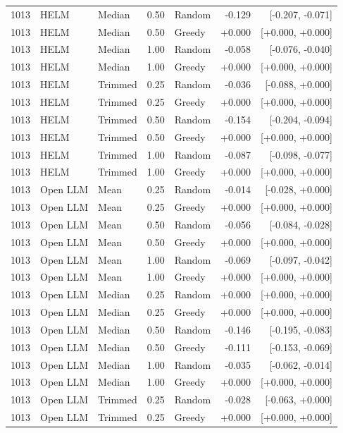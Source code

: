 \documentclass{article}
\begin{document}
\begin{longtable}{rlll lrr}
1013 & HELM & Median & 0.50 & Random & -0.129 & [-0.207, -0.071] \\
1013 & HELM & Median & 0.50 & Greedy & +0.000 & [+0.000, +0.000] \\
1013 & HELM & Median & 1.00 & Random & -0.058 & [-0.076, -0.040] \\
1013 & HELM & Median & 1.00 & Greedy & +0.000 & [+0.000, +0.000] \\
1013 & HELM & Trimmed & 0.25 & Random & -0.036 & [-0.088, +0.000] \\
1013 & HELM & Trimmed & 0.25 & Greedy & +0.000 & [+0.000, +0.000] \\
1013 & HELM & Trimmed & 0.50 & Random & -0.154 & [-0.204, -0.094] \\
1013 & HELM & Trimmed & 0.50 & Greedy & +0.000 & [+0.000, +0.000] \\
1013 & HELM & Trimmed & 1.00 & Random & -0.087 & [-0.098, -0.077] \\
1013 & HELM & Trimmed & 1.00 & Greedy & +0.000 & [+0.000, +0.000] \\
1013 & Open LLM & Mean & 0.25 & Random & -0.014 & [-0.028, +0.000] \\
1013 & Open LLM & Mean & 0.25 & Greedy & +0.000 & [+0.000, +0.000] \\
1013 & Open LLM & Mean & 0.50 & Random & -0.056 & [-0.084, -0.028] \\
1013 & Open LLM & Mean & 0.50 & Greedy & +0.000 & [+0.000, +0.000] \\
1013 & Open LLM & Mean & 1.00 & Random & -0.069 & [-0.097, -0.042] \\
1013 & Open LLM & Mean & 1.00 & Greedy & +0.000 & [+0.000, +0.000] \\
1013 & Open LLM & Median & 0.25 & Random & +0.000 & [+0.000, +0.000] \\
1013 & Open LLM & Median & 0.25 & Greedy & +0.000 & [+0.000, +0.000] \\
1013 & Open LLM & Median & 0.50 & Random & -0.146 & [-0.195, -0.083] \\
1013 & Open LLM & Median & 0.50 & Greedy & -0.111 & [-0.153, -0.069] \\
1013 & Open LLM & Median & 1.00 & Random & -0.035 & [-0.062, -0.014] \\
1013 & Open LLM & Median & 1.00 & Greedy & +0.000 & [+0.000, +0.000] \\
1013 & Open LLM & Trimmed & 0.25 & Random & -0.028 & [-0.063, +0.000] \\
1013 & Open LLM & Trimmed & 0.25 & Greedy & +0.000 & [+0.000, +0.000] \\

\end{longtable}
\end{document}
